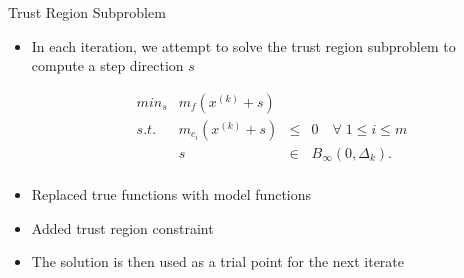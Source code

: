 \documentclass{beamer}
\newcommand{\xk}{{{x}^{(k)}}}
\newcommand{\dk}{{\Delta_k}}
\newcommand{\mk}{{m_f}}
\newcommand{\mck}{{m_{c_i}}}
\begin{document}
\begin{frame}{Trust Region Subproblem}
	\begin{itemize}
		\item In each iteration, we attempt to solve the trust region subproblem to compute a step direction $s$

		\begin{displaymath}
\begin{array}{lrcc}
min_s & \mk(\xk + s)   &	 &			\\
s.t.  &  \mck(\xk + s) & \le & 0   \quad \forall \; 1 \le i \le m	   \\
	  &  s & \in & B_{\infty}(0, \dk).  \\
\end{array}
		\end{displaymath}
		\item Replaced true functions with model functions
		\item Added trust region constraint
		\item The solution is then used as a trial point for the next iterate
	\end{itemize}
\end{frame}

\end{document}
